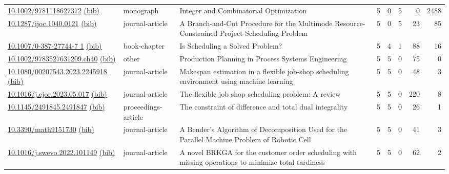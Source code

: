 {\begin{longtable}{p{5cm}lp{11cm}rrrrr}
\href{http://dx.doi.org/10.1002/9781118627372}{10.1002/9781118627372} \href{https://www.doi2bib.org/bib/10.1002/9781118627372}{(bib)} & monograph & Integer and Combinatorial Optimization & 5 & 0 & 5 & 0 & 2488 \\
\href{http://dx.doi.org/10.1287/ijoc.1040.0121}{10.1287/ijoc.1040.0121} \href{https://www.doi2bib.org/bib/10.1287/ijoc.1040.0121}{(bib)} & journal-article & A Branch-and-Cut Procedure for the Multimode Resource-Constrained Project-Scheduling Problem & 5 & 0 & 5 & 23 & 85 \\
\href{http://dx.doi.org/10.1007/0-387-27744-7_1}{10.1007/0-387-27744-7 1} \href{https://www.doi2bib.org/bib/10.1007/0-387-27744-7_1}{(bib)} & book-chapter & Is Scheduling a Solved Problem? & 5 & 4 & 1 & 88 & 16 \\
\href{http://dx.doi.org/10.1002/9783527631209.ch40}{10.1002/9783527631209.ch40} \href{https://www.doi2bib.org/bib/10.1002/9783527631209.ch40}{(bib)} & other & Production Planning in Process Systems Engineering & 5 & 5 & 0 & 75 & 0 \\
\href{http://dx.doi.org/10.1080/00207543.2023.2245918}{10.1080/00207543.2023.2245918} \href{https://www.doi2bib.org/bib/10.1080/00207543.2023.2245918}{(bib)} & journal-article & Makespan estimation in a flexible job-shop scheduling environment using machine learning & 5 & 5 & 0 & 48 & 3 \\
\href{http://dx.doi.org/10.1016/j.ejor.2023.05.017}{10.1016/j.ejor.2023.05.017} \href{https://www.doi2bib.org/bib/10.1016/j.ejor.2023.05.017}{(bib)} & journal-article & The flexible job shop scheduling problem: A review & 5 & 5 & 0 & 220 & 8 \\
\href{http://dx.doi.org/10.1145/2491845.2491847}{10.1145/2491845.2491847} \href{https://www.doi2bib.org/bib/10.1145/2491845.2491847}{(bib)} & proceedings-article & The constraint of difference and total dual integrality & 5 & 5 & 0 & 26 & 1 \\
\href{http://dx.doi.org/10.3390/math9151730}{10.3390/math9151730} \href{https://www.doi2bib.org/bib/10.3390/math9151730}{(bib)} & journal-article & A Bender's Algorithm of Decomposition Used for the Parallel Machine Problem of Robotic Cell & 5 & 5 & 0 & 41 & 3 \\
\href{http://dx.doi.org/10.1016/j.swevo.2022.101149}{10.1016/j.swevo.2022.101149} \href{https://www.doi2bib.org/bib/10.1016/j.swevo.2022.101149}{(bib)} & journal-article & A novel BRKGA for the customer order scheduling with missing operations to minimize total tardiness & 5 & 5 & 0 & 62 & 2 \\

\end{longtable}}
